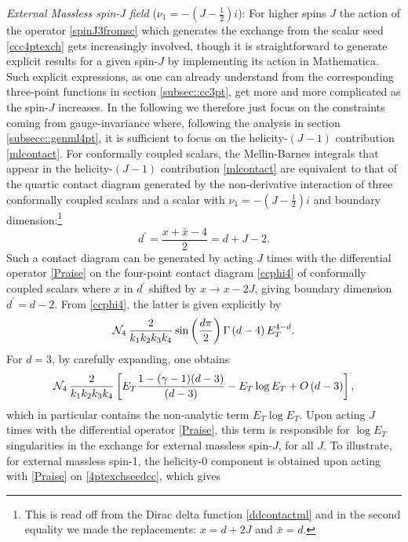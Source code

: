 \documentclass[11pt,a4paper]{article}
\begin{document}
\noindent \emph{External Massless spin-J field} ($\nu_1=-\left(J-\tfrac{1}{2}\right)i$): For higher spins $J$ the action of the operator \eqref{spinJ3fromsc} which generates the exchange from the scalar seed \eqref{ccc4ptexch} gets increasingly involved, though it is straightforward to generate explicit results for a given spin-$J$ by implementing its action in Mathematica. Such explicit expressions, as one can already understand from the corresponding three-point functions in section \ref{subsec::cc3pt}, get more and more complicated as the spin-$J$ increases. In the following we therefore just focus on the constraints coming from gauge-invariance where, following the analysis in section \ref{subsecc::genml4pt}, it is sufficient to focus on the helicity-$\left(J-1\right)$ contribution \eqref{mlcontact}. For conformally coupled scalars, the Mellin-Barnes integrals that appear in the helicity-$\left(J-1\right)$ contribution \eqref{mlcontact} are equivalent to that of the quartic contact diagram generated by the non-derivative interaction of three conformally coupled scalars and a scalar with $\nu_1 = -\left(J-\tfrac{1}{2}\right)i$ and boundary dimension:\footnote{This is read off from the Dirac delta function \eqref{ddcontactml} and in the second equality we made the replacements: $x=d+2J$ and ${\bar x}=d$.}
\begin{equation}
  d^\prime=\frac{x+{\bar x}-4}{2}=d+J-2.
\end{equation} 
Such a contact diagram can be generated by acting $J$ times with the differential operator \eqref{Praise} on the four-point contact diagram \eqref{ccphi4} of conformally coupled scalars where $x$ in $d^\prime$ shifted by $x \to x-2J$, giving boundary dimension $d^\prime=d-2$. From \eqref{ccphi4}, the latter is given explicitly by
\begin{align}\label{4ptexchseedcc}
   {\cal N}_4\, \frac{2}{k_1k_2k_3k_4} \sin \left(\frac{d \pi}{2}\right) \Gamma \left(d-4\right)  E_T^{4-d}.
\end{align}
For $d=3$, by carefully expanding, one obtains
\begin{align}
 {\cal N}_4\, \frac{2}{k_1k_2k_3k_4}\left[  E_T\frac{ 1-(\gamma -1)(d-3)}{(d-3)}-E_T \log E_T+O\left(d-3\right)\right],
\end{align}
which in particular contains the non-analytic term $E_T \log E_T$. Upon acting $J$ times with the differential operator \eqref{Praise}, this term is responsible for $\log E_T$ singularities in the exchange for external massless spin-$J$, for all $J$. To illustrate, for external massless spin-1, the helicity-0 component is obtained upon acting with \eqref{Praise} on \eqref{4ptexchseedcc}, which gives
\end{document}
